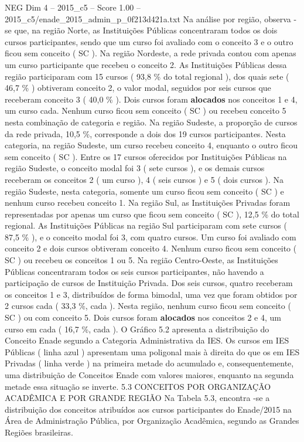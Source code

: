 \begin{textsample}{NEG Dim 4 – 2015\_c5 – Score 1.00 – 2015\_c5/enade\_2015\_admin\_p\_0f213d421a.txt}
Na análise por região, observa -se que, na região Norte, as Instituições Públicas concentraram todos os dois cursos participantes, sendo que um curso foi avaliado com o conceito 3 e o outro ficou sem conceito ( SC ).
Na região Nordeste, a rede privada contou com apenas um curso participante que recebeu o conceito 2.
As Instituições Públicas dessa região participaram com 15 cursos ( 93,8 \% do total regional ), dos quais sete ( 46,7 \% ) obtiveram conceito 2, o valor modal, seguidos por seis cursos que receberam conceito 3 ( 40,0 \% ).
Dois cursos foram \textbf{alocados} nos conceitos 1 e 4, um curso cada.
Nenhum curso ficou sem conceito ( SC ) ou recebeu conceito 5 nesta combinação de categoria e região.
Na região Sudeste, a proporção de cursos da rede privada, 10,5 \%, corresponde a dois dos 19 cursos participantes.
Nesta categoria, na região Sudeste, um curso recebeu conceito 4, enquanto o outro ficou sem conceito ( SC ).
Entre os 17 cursos oferecidos por Instituições Públicas na região Sudeste, o conceito modal foi 3 ( sete cursos ), e os demais cursos receberam os conceitos 2 ( um curso ), 4 ( seis cursos ) e 5 ( dois cursos ).
Na região Sudeste, nesta categoria, somente um curso ficou sem conceito ( SC ) e nenhum curso recebeu conceito 1.
Na região Sul, as Instituições Privadas foram representadas por apenas um curso que ficou sem conceito ( SC ), 12,5 \% do total regional.
As Instituições Públicas na região Sul participaram com sete cursos ( 87,5 \% ), e o conceito modal foi 3, com quatro cursos.
Um curso foi avaliado com conceito 2 e dois cursos obtiveram conceito 4.
Nenhum curso ficou sem conceito ( SC ) ou recebeu os conceitos 1 ou 5.
Na região Centro-Oeste, as Instituições Públicas concentraram todos os seis cursos participantes, não havendo a participação de cursos de Instituição Privada.
Dos seis cursos, quatro receberam os conceitos 1 e 3, distribuídos de forma bimodal, uma vez que foram obtidos por 2 cursos cada ( 33,3 \%, cada ).
Nesta região, nenhum curso ficou sem conceito ( SC ) ou com conceito 5.
Dois cursos foram \textbf{alocados} nos conceitos 2 e 4, um curso em cada ( 16,7 \%, cada ).
O Gráfico 5.2 apresenta a distribuição do Conceito Enade segundo a Categoria Administrativa da IES.
Os cursos em IES Públicas ( linha azul ) apresentam uma poligonal mais à direita do que os em IES Privadas ( linha verde ) na primeira metade do acumulado e, consequentemente, uma distribuição de Conceitos Enade com valores maiores, enquanto na segunda metade essa situação se inverte. 5.3 CONCEITOS POR ORGANIZAÇÃO ACADÊMICA E POR GRANDE REGIÃO Na Tabela 5.3, encontra -se a distribuição dos conceitos atribuídos aos cursos participantes do Enade/2015 na Área de Administração Pública, por Organização Acadêmica, segundo as Grandes Regiões brasileiras.

\end{textsample}

